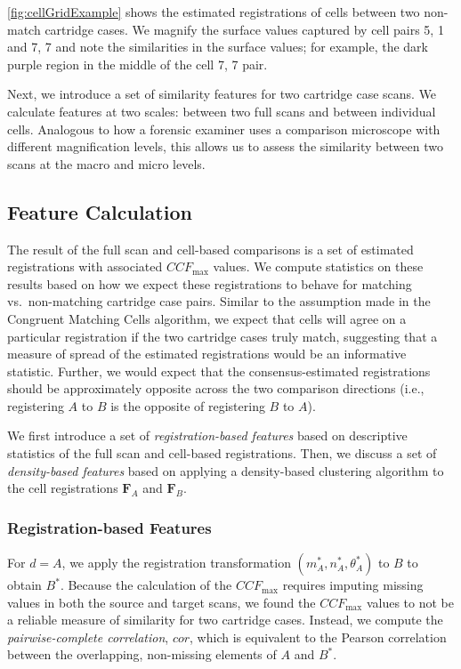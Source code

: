 \documentclass[reprint]{JASA}
\begin{document}
\autoref{fig:cellGridExample} shows the estimated registrations of cells
between two non-match cartridge cases. We magnify the surface values
captured by cell pairs 5, 1 and 7, 7 and note the similarities in the
surface values; for example, the dark purple region in the middle of the
cell 7, 7 pair.

Next, we introduce a set of similarity features for two cartridge case
scans. We calculate features at two scales: between two full scans and
between individual cells. Analogous to how a forensic examiner uses a
comparison microscope with different magnification levels, this allows
us to assess the similarity between two scans at the macro and micro
levels.

\hypertarget{featureCalculation}{%
\subsection{Feature Calculation}\label{featureCalculation}}

The result of the full scan and cell-based comparisons is a set of
estimated registrations with associated \(CCF_{\max}\) values. We
compute statistics on these results based on how we expect these
registrations to behave for matching vs.~non-matching cartridge case
pairs. Similar to the assumption made in the Congruent Matching Cells
algorithm, we expect that cells will agree on a particular registration
if the two cartridge cases truly match, suggesting that a measure of
spread of the estimated registrations would be an informative statistic.
Further, we would expect that the consensus-estimated registrations
should be approximately opposite across the two comparison directions
(i.e., registering \(A\) to \(B\) is the opposite of registering \(B\)
to \(A\)).

We first introduce a set of \emph{registration-based features} based on
descriptive statistics of the full scan and cell-based registrations.
Then, we discuss a set of \emph{density-based features} based on
applying a density-based clustering algorithm to the cell registrations
\(\pmb{F}_A\) and \(\pmb{F}_B\).

\hypertarget{registration-based-features}{%
\subsubsection{Registration-based
Features}\label{registration-based-features}}

For \(d = A\), we apply the registration transformation
\((m^*_A,n^*_A,\theta^*_A)\) to \(B\) to obtain \(B^*\). Because the
calculation of the \(CCF_{\max}\) requires imputing missing values in
both the source and target scans, we found the \(CCF_{\max}\) values to
not be a reliable measure of similarity for two cartridge cases.
Instead, we compute the \emph{pairwise-complete correlation}, \(cor\),
which is equivalent to the Pearson correlation between the overlapping,
non-missing elements of \(A\) and \(B^*\).
\end{document}
